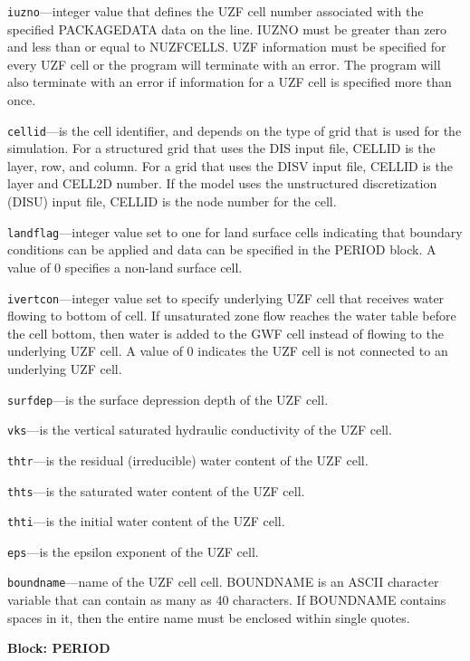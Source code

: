 \begin{description}
\item \texttt{iuzno}---integer value that defines the UZF cell number associated with the specified PACKAGEDATA data on the line. IUZNO must be greater than zero and less than or equal to NUZFCELLS.  UZF information must be specified for every UZF cell or the program will terminate with an error.  The program will also terminate with an error if information for a UZF cell is specified more than once.

\item \texttt{cellid}---is the cell identifier, and depends on the type of grid that is used for the simulation.  For a structured grid that uses the DIS input file, CELLID is the layer, row, and column.   For a grid that uses the DISV input file, CELLID is the layer and CELL2D number.  If the model uses the unstructured discretization (DISU) input file, CELLID is the node number for the cell.

\item \texttt{landflag}---integer value set to one for land surface cells indicating that boundary conditions can be applied and data can be specified in the PERIOD block. A value of 0 specifies a non-land surface cell.

\item \texttt{ivertcon}---integer value set to specify underlying UZF cell that receives water flowing to bottom of cell. If unsaturated zone flow reaches the water table before the cell bottom, then water is added to the GWF cell instead of flowing to the underlying UZF cell. A value of 0 indicates the UZF cell is not connected to an underlying UZF cell.

\item \texttt{surfdep}---is the surface depression depth of the UZF cell.

\item \texttt{vks}---is the vertical saturated hydraulic conductivity of the UZF cell.

\item \texttt{thtr}---is the residual (irreducible) water content of the UZF cell.

\item \texttt{thts}---is the saturated water content of the UZF cell.

\item \texttt{thti}---is the initial water content of the UZF cell.

\item \texttt{eps}---is the epsilon exponent of the UZF cell.

\item \texttt{boundname}---name of the UZF cell cell.  BOUNDNAME is an ASCII character variable that can contain as many as 40 characters.  If BOUNDNAME contains spaces in it, then the entire name must be enclosed within single quotes.

\end{description}
\item \textbf{Block: PERIOD}


